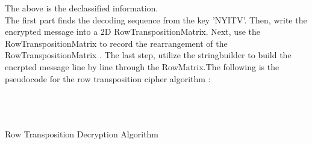 \documentclass[twoside,twocolumn]{article}
\begin{document}
The above is the declassified information. \\

The first part finds the decoding sequence from the key 'NYITV'. Then, write the encrypted message into a 2D RowTranspositionMatrix. Next, use the RowTranspositionMatrix to record the rearrangement of the RowTranspositionMatrix . The last step, utilize the stringbuilder to build the encrpted message line by line through the RowMatrix.The following is the pseudocode for the row transposition cipher algorithm : \\ \\ \\ \\

\vspace*{-1.5cm}

 {\footnotesize Row Transposition Decryption Algorithm}
\renewcommand {\algorithmicrequire}{\textbf{input:}}
\renewcommand{\algorithmicensure}{\textbf{output:}}
\end{document}
